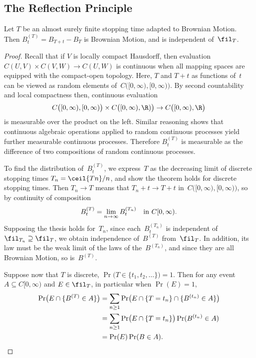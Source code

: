 \subsection	{The Reflection Principle}

\begin	{theorem}
Let $T$ be an almost surely finite stopping time adapted to Brownian Motion.
Then \( B^{(T)}_t = B_{T+t} - B_T \) is Brownian Motion,
and is independent of~$\fil_T$.
\end	{theorem}
\begin	{proof}
Recall that if $V$ is locally compact Hausdorff,
then evaluation \( C(U,V) \times C(V,W) \to C(U,W) \) is continuous
when all mapping spaces are equipped with the compact-open topology.
Here, $T$ and \( T + t \) as functions of~$t$
can be viewed as random elements of~$C\bigl([0,\infty),[0,\infty)\bigr)$.
By second countability and local compactness then,
continuous evaluation \[
	C\bigl([0,\infty),[0,\infty)\bigr) \times
		C\bigl([0,\infty),\R)\bigr)
	\to C\bigl([0,\infty),\R\bigr)
\] is measurable over the product on the left.
Similar reasoning shows that continuous algebraic operations
applied to random continuous processes
yield further measurable continuous processes.
Therefore $B^{(T)}_t$ is measurable as the difference
of two compositions of random continuous processes.

To find the distribution of~$B^{(T)}_t$,
we express~$T$ as the decreasing limit of discrete stopping times
\( T_n = \ceil{Tn}/n \),
and show the theorem holds for discrete stopping times.
Then \( T_n \to T \) means that \( T_n + t \to T + t \)
in~$C\bigl([0,\infty),[0,\infty)\bigr)$,
so by continuity of composition \[
	B^{(T)}_t = \lim_{n\to\infty} B^{(T_n)}_t
	\quad \text{in~\( C[0,\infty) \).}
\]
Supposing the thesis holds for~$T_n$,
since each~$B^{(T_n)}_t$ is independent of~\( \fil_{T_n} \supseteq \fil_T \),
we obtain independence of~$B^{(T)}$ from~$\fil_T$.
In addition, its law must be the weak limit of the laws of the~$B^{(T_n)}$,
and since they are all Brownian Motion, so is~$B^{(T)}$.

Suppose now that $T$ is discrete,
\( \Pr\bigl(T\in\{t_1,t_2,\dotsc\}\bigr) = 1 \).
Then for any event \( A \subseteq C[0,\infty) \) and \( E \in \fil_T \),
in particular when \( \Pr(E) = 1 \),
\begin	{align*}
	\Pr\bigl(E\cap\{B^{(T)}\in A\}\bigr)
	&=	\sum_{n\ge1} \Pr\bigl(
			E \cap \{T=t_n\} \cap \{B^{(t_n)}\in A\}
		\bigr) \\
	&=	\sum_{n\ge1} \Pr\bigl( E \cap \{T=t_n\} \bigr)
			\Pr(B^{(t_n)}\in A) \\
	&=	\Pr(E) \Pr( B \in A )
	\text.
	\qedhere
\end	{align*}
\end	{proof}

